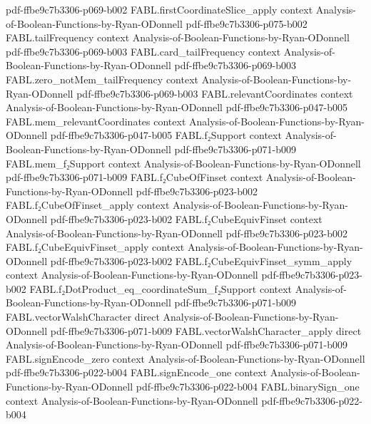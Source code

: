 \begin{theorem}
  {pdf-ffbe9c7b3306-p069-b002}
\proofstep
  {FABL.firstCoordinateSlice_apply}
  {context}
  {Analysis-of-Boolean-Functions-by-Ryan-ODonnell}
  {pdf-ffbe9c7b3306-p075-b002}
\proofstep
  {FABL.tailFrequency}
  {context}
  {Analysis-of-Boolean-Functions-by-Ryan-ODonnell}
  {pdf-ffbe9c7b3306-p069-b003}
\proofstep
  {FABL.card_tailFrequency}
  {context}
  {Analysis-of-Boolean-Functions-by-Ryan-ODonnell}
  {pdf-ffbe9c7b3306-p069-b003}
\proofstep
  {FABL.zero_notMem_tailFrequency}
  {context}
  {Analysis-of-Boolean-Functions-by-Ryan-ODonnell}
  {pdf-ffbe9c7b3306-p069-b003}
\proofstep
  {FABL.relevantCoordinates}
  {context}
  {Analysis-of-Boolean-Functions-by-Ryan-ODonnell}
  {pdf-ffbe9c7b3306-p047-b005}
\proofstep
  {FABL.mem_relevantCoordinates}
  {context}
  {Analysis-of-Boolean-Functions-by-Ryan-ODonnell}
  {pdf-ffbe9c7b3306-p047-b005}
\proofstep
  {FABL.f₂Support}
  {context}
  {Analysis-of-Boolean-Functions-by-Ryan-ODonnell}
  {pdf-ffbe9c7b3306-p071-b009}
\proofstep
  {FABL.mem_f₂Support}
  {context}
  {Analysis-of-Boolean-Functions-by-Ryan-ODonnell}
  {pdf-ffbe9c7b3306-p071-b009}
\proofstep
  {FABL.f₂CubeOfFinset}
  {context}
  {Analysis-of-Boolean-Functions-by-Ryan-ODonnell}
  {pdf-ffbe9c7b3306-p023-b002}
\proofstep
  {FABL.f₂CubeOfFinset_apply}
  {context}
  {Analysis-of-Boolean-Functions-by-Ryan-ODonnell}
  {pdf-ffbe9c7b3306-p023-b002}
\proofstep
  {FABL.f₂CubeEquivFinset}
  {context}
  {Analysis-of-Boolean-Functions-by-Ryan-ODonnell}
  {pdf-ffbe9c7b3306-p023-b002}
\proofstep
  {FABL.f₂CubeEquivFinset_apply}
  {context}
  {Analysis-of-Boolean-Functions-by-Ryan-ODonnell}
  {pdf-ffbe9c7b3306-p023-b002}
\proofstep
  {FABL.f₂CubeEquivFinset_symm_apply}
  {context}
  {Analysis-of-Boolean-Functions-by-Ryan-ODonnell}
  {pdf-ffbe9c7b3306-p023-b002}
\proofstep
  {FABL.f₂DotProduct_eq_coordinateSum_f₂Support}
  {context}
  {Analysis-of-Boolean-Functions-by-Ryan-ODonnell}
  {pdf-ffbe9c7b3306-p071-b009}
\proofstep
  {FABL.vectorWalshCharacter}
  {direct}
  {Analysis-of-Boolean-Functions-by-Ryan-ODonnell}
  {pdf-ffbe9c7b3306-p071-b009}
\proofstep
  {FABL.vectorWalshCharacter_apply}
  {direct}
  {Analysis-of-Boolean-Functions-by-Ryan-ODonnell}
  {pdf-ffbe9c7b3306-p071-b009}
\proofstep
  {FABL.signEncode_zero}
  {context}
  {Analysis-of-Boolean-Functions-by-Ryan-ODonnell}
  {pdf-ffbe9c7b3306-p022-b004}
\proofstep
  {FABL.signEncode_one}
  {context}
  {Analysis-of-Boolean-Functions-by-Ryan-ODonnell}
  {pdf-ffbe9c7b3306-p022-b004}
\proofstep
  {FABL.binarySign_one}
  {context}
  {Analysis-of-Boolean-Functions-by-Ryan-ODonnell}
  {pdf-ffbe9c7b3306-p022-b004}
\proofstep

\end{theorem}
